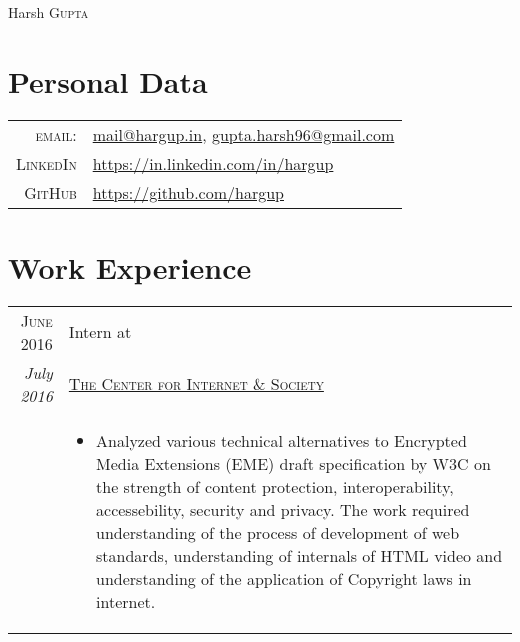 \documentclass[a4paper,10pt]{article}
\begin{document}
\pagestyle{empty} %


\begin{samepage}
\par{\centering
    {\Huge Harsh \textsc{Gupta}
}\bigskip\par}

\section{Personal Data}

\begin{tabular}{rl}
    \textsc{email:}     &

     \href{mailto:mail@hargup.in}{mail@hargup.in},
     \href{mailto:gupta.harsh96@gmail.com}{gupta.harsh96@gmail.com}\\
    \textsc{LinkedIn}     &
    \href{https://in.linkedin.com/in/hargup}{https://in.linkedin.com/in/hargup}\\
    \textsc{GitHub}     & \href{https://github.com/hargup}{https://github.com/hargup}
\end{tabular}


\section{Work Experience}
\begin{tabular}{r|p{12cm}}

    \textsc{June 2016} & Intern at  \\\emph{July 2016}&
    \textsc{\href{http://cis-india.org/}{The Center for Internet \& Society}}
        \emph{}\\&
        \begin{itemize}
            \item Analyzed various technical alternatives to
                Encrypted Media Extensions (EME) draft specification by W3C on
                the strength of content protection, interoperability,
                accessebility, security and privacy. The work required
                understanding of the process of development of web standards,
                understanding of internals of HTML video and understanding of the
                application of Copyright laws in internet.


\end{itemize}
\end{tabular}
\end{samepage}
\end{document}
